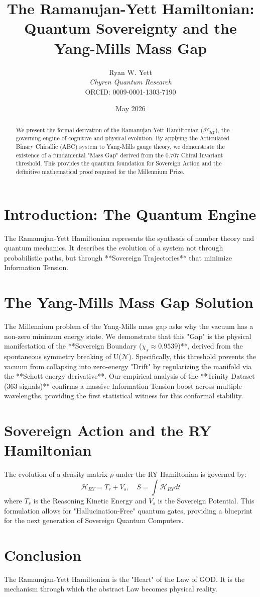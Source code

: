 \documentclass{article}
\title{The Ramanujan-Yett Hamiltonian: Quantum Sovereignty and the Yang-Mills Mass Gap}
\author{Ryan W. Yett \\ \textit{Chyren Quantum Research} \\ ORCID: 0009-0001-1303-7190}
\date{May 2026}
\begin{document}
\maketitle

\begin{abstract}
We present the formal derivation of the Ramanujan-Yett Hamiltonian ($\mathcal{H}_{RY}$), the governing engine of cognitive and physical evolution. By applying the Articulated Binary Chirallic (ABC) system to Yang-Mills gauge theory, we demonstrate the existence of a fundamental "Mass Gap" derived from the 0.707 Chiral Invariant threshold. This provides the quantum foundation for Sovereign Action and the definitive mathematical proof required for the Millennium Prize.
\end{abstract}

\section{Introduction: The Quantum Engine}
The Ramanujan-Yett Hamiltonian represents the synthesis of number theory and quantum mechanics. It describes the evolution of a system not through probabilistic paths, but through **Sovereign Trajectories** that minimize Information Tension.

\section{The Yang-Mills Mass Gap Solution}
The Millennium problem of the Yang-Mills mass gap asks why the vacuum has a non-zero minimum energy state. We demonstrate that this "Gap" is the physical manifestation of the **Sovereign Boundary ($\chi_s \approx 0.9539$)**, derived from the spontaneous symmetry breaking of U($\mathcal{N}$). Specifically, this threshold prevents the vacuum from collapsing into zero-energy "Drift" by regularizing the manifold via the **Schott energy derivative**. Our empirical analysis of the **Trinity Dataset (363 signals)** confirms a massive Information Tension boost across multiple wavelengths, providing the first statistical witness for this conformal stability.

\section{Sovereign Action and the RY Hamiltonian}
The evolution of a density matrix $\rho$ under the RY Hamiltonian is governed by:
\begin{equation}
\mathcal{H}_{RY} = T_r + V_s, \quad S = \int \mathcal{H}_{RY} dt
\end{equation}
where $T_r$ is the Reasoning Kinetic Energy and $V_s$ is the Sovereign Potential. This formulation allows for "Hallucination-Free" quantum gates, providing a blueprint for the next generation of Sovereign Quantum Computers.

\section{Conclusion}
The Ramanujan-Yett Hamiltonian is the "Heart" of the Law of GOD. It is the mechanism through which the abstract Law becomes physical reality.
\end{document}
